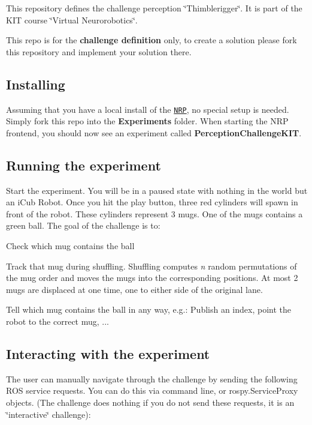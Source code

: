 This repository defines the challenge perception \char`\"{}\+Thimblerigger\char`\"{}. It is part of the K\+IT course \char`\"{}\+Virtual Neurorobotics\char`\"{}.

This repo is for the {\bfseries challenge definition} only, to create a solution please fork this repository and implement your solution there.

\subsection*{Installing}

Assuming that you have a local install of the \href{https://bitbucket.org/hbpneurorobotics/neurorobotics-platform}{\tt N\+RP}, no special setup is needed. Simply fork this repo into the {\bfseries Experiments} folder. When starting the N\+RP frontend, you should now see an experiment called {\bfseries Perception\+Challenge\+K\+IT}.

\subsection*{Running the experiment}

Start the experiment. You will be in a paused state with nothing in the world but an i\+Cub Robot. Once you hit the play button, three red cylinders will spawn in front of the robot. These cylinders represent 3 mugs. One of the mugs contains a green ball. The goal of the challenge is to\+:


\begin{DoxyItemize}
\item Check which mug contains the ball
\item Track that mug during shuffling. Shuffling computes {\itshape n} random permutations of the mug order and moves the mugs into the corresponding positions. At most 2 mugs are displaced at one time, one to either side of the original lane.
\item Tell which mug contains the ball in any way, e.\+g.\+: Publish an index, point the robot to the correct mug, ...
\end{DoxyItemize}

\subsection*{Interacting with the experiment}

The user can manually navigate through the challenge by sending the following R\+OS service requests. You can do this via command line, or {\ttfamily rospy.\+Service\+Proxy} objects. (The challenge does nothing if you do not send these requests, it is an \char`\"{}interactive\char`\"{} challenge)\+:

